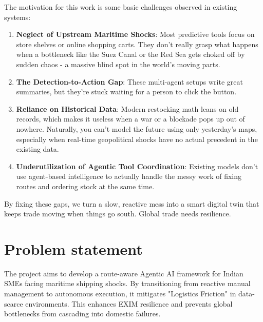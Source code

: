 The motivation for this work is some basic challenges observed in existing systems:
\begin{enumerate}
    \item \textbf{Neglect of Upstream Maritime Shocks}: Most predictive tools focus on store shelves or online shopping carts. They don't really grasp what happens when a bottleneck like the Suez Canal or the Red Sea gets choked off by sudden chaos - a massive blind spot in the world's moving parts.
    \item \textbf{The Detection-to-Action Gap}: These multi-agent setups write great summaries, but they're stuck waiting for a person to click the button. 
    \item \textbf{Reliance on Historical Data}: Modern restocking math leans on old records, which makes it useless when a war or a blockade pops up out of nowhere. Naturally, you can't model the future using only yesterday's maps, especially when real-time geopolitical shocks have no actual precedent in the existing data.
    \item \textbf{Underutilization of Agentic Tool Coordination}: Existing models don't use agent-based intelligence to actually handle the messy work of fixing routes and ordering stock at the same time.
\end{enumerate}

By fixing these gaps, we turn a slow, reactive mess into a smart digital twin that keeps trade moving when things go south. Global trade needs resilience.


\section[Problem statement]{\textbf{Problem statement}}
The project aims to develop a route-aware Agentic AI framework for Indian SMEs facing maritime shipping shocks. By transitioning from reactive manual management to autonomous execution, it mitigates "Logistics Friction" in data-scarce environments. This enhances EXIM resilience and prevents global bottlenecks from cascading into domestic failures.
